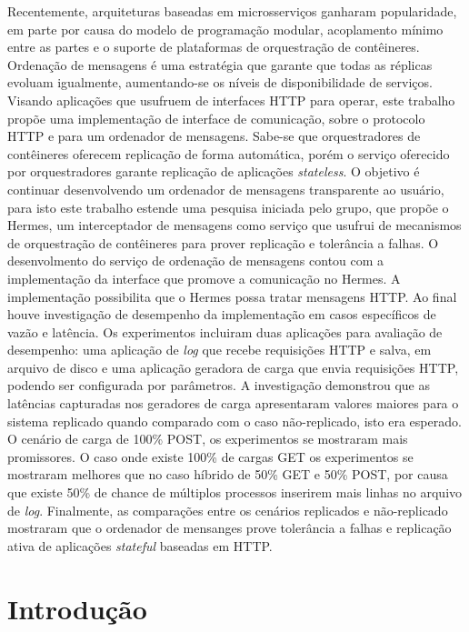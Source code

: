 \documentclass[12pt]{article}
\begin{document}
\begin{resumo} 
Recentemente, arquiteturas baseadas em microsserviços ganharam popularidade, em parte por causa do modelo de programação modular, acoplamento mínimo entre as partes e o suporte de plataformas de orquestração de contêineres. Ordenação de mensagens é uma estratégia que garante que todas as réplicas evoluam igualmente, aumentando-se os níveis de disponibilidade de serviços. Visando aplicações que usufruem de interfaces {HTTP} para operar, este trabalho propõe uma implementação de interface de comunicação, sobre o protocolo HTTP e para um ordenador de mensagens. Sabe-se que orquestradores de contêineres oferecem replicação de forma automática, porém o serviço oferecido por orquestradores garante replicação de aplicações \textit{stateless}. O objetivo é continuar desenvolvendo um ordenador de mensagens transparente ao usuário, para isto este trabalho estende uma pesquisa iniciada pelo grupo, que propõe o Hermes, um interceptador de mensagens como serviço que usufrui de mecanismos de orquestração de contêineres para prover replicação e tolerância a falhas. O desenvolmento do serviço de ordenação de mensagens contou com a implementação da interface que promove a comunicação no Hermes. A implementação possibilita que o Hermes possa tratar mensagens {HTTP}. Ao final houve investigação de desempenho da implementação em casos específicos de vazão e latência. Os experimentos incluiram duas aplicações para avaliação de desempenho: uma aplicação de \textit{log} que recebe requisições HTTP e salva, em arquivo de disco e uma aplicação geradora de carga que envia requisições HTTP, podendo ser configurada por parâmetros. A investigação demonstrou que as latências capturadas nos geradores de carga apresentaram valores maiores para o sistema replicado quando comparado com o caso não-replicado, isto era esperado. O cenário de carga de 100\% POST, os experimentos se mostraram mais promissores. O caso onde existe 100\% de cargas GET os experimentos se mostraram melhores que no caso híbrido de 50\% GET e 50\% POST, por causa que existe 50\% de chance de múltiplos processos inserirem mais linhas no arquivo de \textit{log}. Finalmente, as comparações entre os cenários replicados e não-replicado mostraram que o ordenador de mensanges prove tolerância a falhas e replicação ativa de aplicações \textit{stateful} baseadas em HTTP.
\end{resumo}

\section{Introdução}
\end{document}
